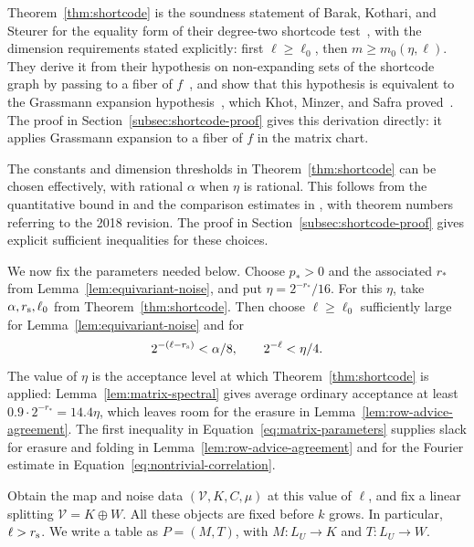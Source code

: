 Theorem~\ref{thm:shortcode} is the soundness statement of Barak,
Kothari, and Steurer for the equality form of their degree-two shortcode
test~\cite[Hypothesis~2.1 and Section~1.6]{BKS18}, with the dimension
requirements stated explicitly: first $\ell\ge\ell_0$, then
$m\ge m_0(\eta,\ell)$.  They derive it from their hypothesis on
non-expanding sets of the shortcode graph by passing to a fiber of
$f$~\cite[Hypothesis~1.8 and Lemma~2.3]{BKS18}, and show that this
hypothesis is equivalent to the Grassmann expansion
hypothesis~\cite[Theorem~1.11]{BKS18}, which Khot, Minzer, and Safra
proved~\cite[Theorem~1.12]{KMS23}.  The proof in
Section~\ref{subsec:shortcode-proof} gives this derivation directly: it
applies Grassmann expansion to a fiber of $f$ in the matrix chart.

The constants and dimension thresholds in Theorem~\ref{thm:shortcode}
can be chosen effectively, with rational $\alpha$ when $\eta$ is rational.
This follows from the quantitative bound in
\cite[Theorem~2.13 and Section~2.4]{KMS23} and the comparison estimates
in \cite[Lemmas~2.7--2.8]{KMS23}, with theorem numbers referring to
the 2018 revision.  The proof in Section~\ref{subsec:shortcode-proof}
gives explicit sufficient inequalities for these choices.

We now fix the parameters needed below.  Choose $p_*>0$ and the associated
$r_*$ from Lemma~\ref{lem:equivariant-noise}, and put $\eta=2^{-r_*}/16$.
For this $\eta$, take $\alpha,r_{\rm s},\ell_0$ from
Theorem~\ref{thm:shortcode}.  Then choose $\ell\ge\ell_0$ sufficiently
large for Lemma~\ref{lem:equivariant-noise} and for
\begin{equation}
 2^{-(\ell-r_{\rm s})}<\alpha/8,\qquad 2^{-\ell}<\eta/4.
 \label{eq:matrix-parameters}
\end{equation}
The value of $\eta$ is
the acceptance level at which Theorem~\ref{thm:shortcode} is applied:
Lemma~\ref{lem:matrix-spectral} gives average ordinary acceptance at least
$0.9\cdot2^{-r_*}=14.4\eta$, which leaves room for the erasure in
Lemma~\ref{lem:row-advice-agreement}.  The first inequality in
Equation~\eqref{eq:matrix-parameters} supplies slack for erasure and
folding in Lemma~\ref{lem:row-advice-agreement} and for the Fourier estimate in
Equation~\eqref{eq:nontrivial-correlation}.

Obtain the map and noise data $(\mathcal V,K,C,\mu)$ at this value of $\ell$,
and fix a linear splitting $\mathcal V=K\oplus W$.  All these objects
are fixed before $k$ grows.  In particular, $\ell>r_{\rm s}$.
We write a table as $P=(M,T)$, with $M:L_U\to K$ and $T:L_U\to W$.

